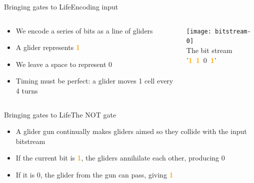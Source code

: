 \documentclass{beamer}
\newcommand{\on}[0]{\textcolor{orange}{\bf 1}\xspace}
\newcommand{\off}[0]{0\xspace}
\begin{document}
\begin{frame}{Bringing gates to Life}{Encoding input}
	\begin{columns}%
	\begin{column}{0.7\textwidth}
		\begin{itemize}
			\item We encode a series of bits as a line of gliders
			\item A glider represents \on
			\item We leave a space to represent \off
			\item Timing must be perfect: a glider moves 1 cell every 4 turns
		\end{itemize}
	\end{column}

	\begin{column}{0.4\textwidth}
		\begin{center}
			\texttt{[image: bitstream-0]} \\
			The bit stream '\on~\on~\off~\on'
		\end{center}
	\end{column}
	\end{columns}
\end{frame}

\begin{frame}[t]{Bringing gates to Life}{The NOT gate}
	\begin{itemize}
		\item A glider gun continually makes gliders aimed so they collide with the input bitstream
		\item If the current bit is \on, the gliders annihilate each other, producing \off
		\item If it is \off, the glider from the gun can pass, giving \on
	\end{itemize}

	\begin{center}
	\end{center}
\end{frame}
\end{document}
